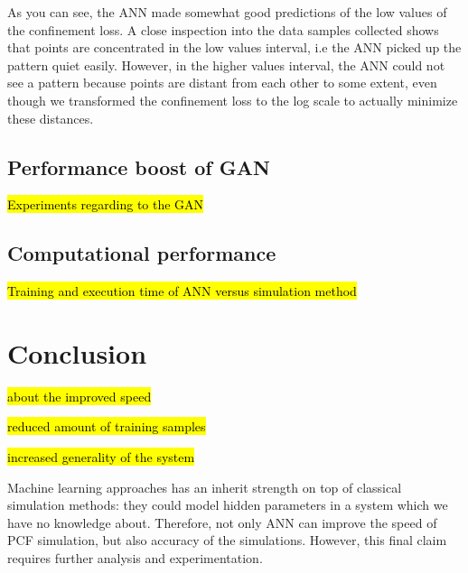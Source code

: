 \documentclass[draft, a4, 10pt, onecolumn]{IEEEtran}
\begin{document}
As you can see, the ANN made somewhat good predictions of the low values of the confinement loss. A close inspection into the data samples collected shows that points are concentrated in the low values interval, i.e the ANN picked up the pattern quiet easily. However, in the higher values interval, the ANN could not see a pattern because points are distant from each other to some extent, even though we transformed the confinement loss to the log scale to actually minimize these distances.

\subsection{Performance boost of GAN}

\hl{Experiments regarding to the GAN}

\subsection{Computational performance}

\hl{Training and execution time of ANN versus simulation method}


\section{Conclusion}
\label{sec:conc}

\hl{about the improved speed}

\hl{reduced amount of training samples}

\hl{increased generality of the system}

Machine learning approaches has an inherit strength on top of classical simulation methods: they could model hidden parameters in a system which we have no knowledge about. Therefore, not only ANN can improve the speed of PCF simulation, but also accuracy of the simulations. However, this final claim requires further analysis and experimentation.
	
\end{document}
